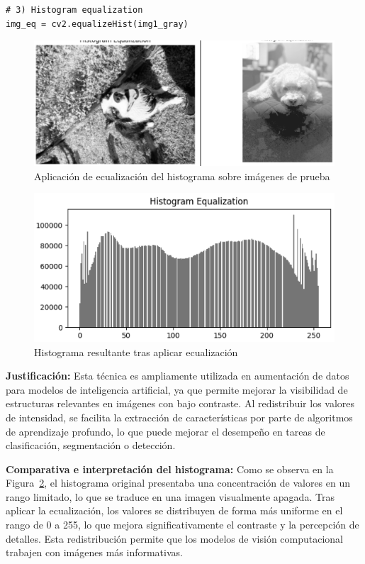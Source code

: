 \documentclass[12pt,letterpaper]{article}
\begin{document}
\begin{verbatim}
# 3) Histogram equalization
img_eq = cv2.equalizeHist(img1_gray)
\end{verbatim}

\begin{figure}[H]
  \centering
  \includegraphics[width=0.8\linewidth]{figuras/ecualizacion_imagen.png}
  \caption{Aplicación de ecualización del histograma sobre imágenes de prueba}
  \label{fig:ecualizacion_imagen}
\end{figure}

\begin{figure}[H]
  \centering
  \includegraphics[width=0.8\linewidth]{figuras/ecualizacion_histograma.png}
  \caption{Histograma resultante tras aplicar ecualización}
  \label{fig:ecualizacion_histograma}
\end{figure}

\textbf{Justificación:} Esta técnica es ampliamente utilizada en aumentación de datos para modelos de inteligencia artificial, ya que permite mejorar la visibilidad de estructuras relevantes en imágenes con bajo contraste. Al redistribuir los valores de intensidad, se facilita la extracción de características por parte de algoritmos de aprendizaje profundo, lo que puede mejorar el desempeño en tareas de clasificación, segmentación o detección.

\textbf{Comparativa e interpretación del histograma:} Como se observa en la Figura~\ref{fig:ecualizacion_histograma}, el histograma original presentaba una concentración de valores en un rango limitado, lo que se traduce en una imagen visualmente apagada. Tras aplicar la ecualización, los valores se distribuyen de forma más uniforme en el rango de 0 a 255, lo que mejora significativamente el contraste y la percepción de detalles. Esta redistribución permite que los modelos de visión computacional trabajen con imágenes más informativas.
\end{document}
